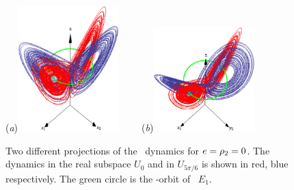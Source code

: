 \begin{figure}[t]
\begin{center}
  (\textit{a})\includegraphics[width=0.35\textwidth, clip=true]{../figs/LorenzCoexA}
~~~~(\textit{b})\includegraphics[width=0.35\textwidth, clip=true]{../figs/LorenzCoexB}
\end{center}
\caption[Complex Lorenz eq. coexisting attractors]{
Two different projections of the \CLe\ dynamics
 for $e=\rho_2=0$. The dynamics in the real
subspace $U_0$ and in $U_{5\pi/6}$ is shown in red, blue
respectively. The green circle is the -orbit of \eqv\
$E_1$.
    }
\label{fig:LorenzCoex}
\end{figure}


